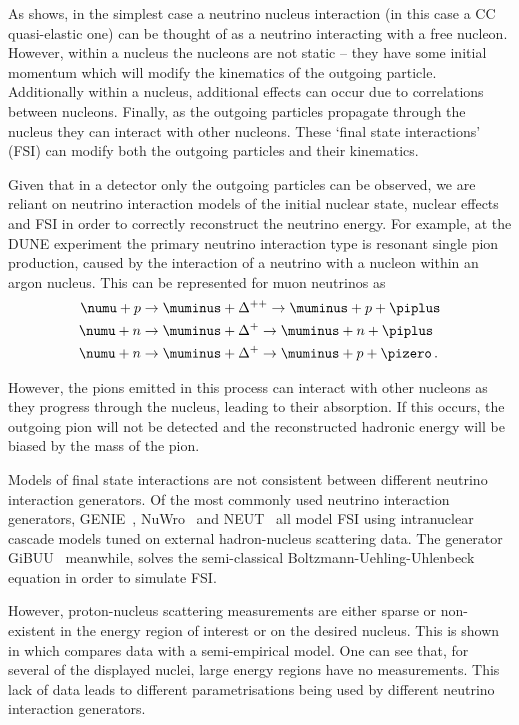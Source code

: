 As  shows, in the simplest case a neutrino nucleus interaction (in this case a CC quasi-elastic one) can be thought of as a neutrino interacting with a free nucleon.
However, within a nucleus the nucleons are not static -- they have some initial momentum which will modify the kinematics of the outgoing particle.
Additionally within a nucleus, additional effects can occur due to correlations between nucleons.
Finally, as the outgoing particles propagate through the nucleus they can interact with other nucleons.
These `final state interactions' (FSI) can modify both the outgoing particles and their kinematics.

Given that in a detector only the outgoing particles can be observed, we are reliant on neutrino interaction models of the initial nuclear state, nuclear effects and FSI in order to correctly reconstruct the neutrino energy.
For example, at the DUNE experiment the primary neutrino interaction type is resonant single pion production, caused by the interaction of a neutrino with a nucleon within an argon nucleus.
This can be represented for muon neutrinos as
\begin{align}
  \numu + p &\rightarrow \muminus + \Delta^{++} \rightarrow \muminus + p + \piplus \\
  \numu + n &\rightarrow \muminus + \Delta^{+} \rightarrow \muminus + n + \piplus \\
  \numu + n &\rightarrow \muminus + \Delta^{+} \rightarrow \muminus + p + \pizero \, .
\end{align}

However, the pions emitted in this process can interact with other nucleons as they progress through the nucleus, leading to their absorption.
If this occurs, the outgoing pion will not be detected and the reconstructed hadronic energy will be biased by the mass of the pion.

Models of final state interactions are not consistent between different neutrino interaction generators.
Of the most commonly used neutrino interaction generators, GENIE~\cite{genie}, NuWro~\cite{nuwro} and NEUT~\cite{neut} all model FSI using intranuclear cascade models tuned on external hadron-nucleus scattering data.
The generator GiBUU~\cite{gibuu} meanwhile, solves the semi-classical Boltzmann-Uehling-Uhlenbeck equation in order to simulate FSI.

However, proton-nucleus scattering measurements are either sparse or non-existent in the energy region of interest or on the desired nucleus.
This is shown in  which compares data with a semi-empirical model.
One can see that, for several of the displayed nuclei, large energy regions have no measurements.
This lack of data leads to different parametrisations being used by different neutrino interaction generators.

